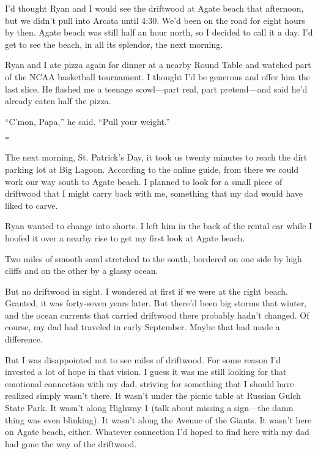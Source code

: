 \documentclass[12pt]{book}
\begin{document}
I'd thought Ryan and I would see the driftwood at Agate beach that afternoon, but we didn't pull into Arcata until 4:30. We'd been on the road for eight hours by then. Agate beach was still half an hour north, so I decided to call it a day. I'd get to see the beach, in all its splendor, the next morning.

Ryan and I ate pizza again for dinner at a nearby Round Table and watched part of the NCAA basketball tournament. I thought I'd be generous and offer him the last slice. He flashed me a teenage scowl---part real, part pretend---and said he'd already eaten half the pizza.

``C'mon, Papa,'' he said. ``Pull your weight.''

\begin{center}$*$\end{center}

The next morning, St. Patrick's Day, it took us twenty minutes to reach the dirt parking lot at Big Lagoon. According to the online guide, from there we could work our way south to Agate beach. I planned to look for a small piece of driftwood that I might carry back with me, something that my dad would have liked to carve.

Ryan wanted to change into shorts. I left him in the back of the rental car while I hoofed it over a nearby rise to get my first look at Agate beach.

Two miles of smooth sand stretched to the south, bordered on one side by high cliffs and on the other by a glassy ocean.

But no driftwood in sight. I wondered at first if we were at the right beach. Granted, it was forty-seven years later. But there'd been big storms that winter, and the ocean currents that carried driftwood there probably hadn't changed. Of course, my dad had traveled in early September. Maybe that had made a difference.

But I was disappointed not to see miles of driftwood. For some reason I'd invested a lot of hope in that vision. I guess it was me still looking for that emotional connection with my dad, striving for something that I should have realized simply wasn't there. It wasn't under the picnic table at Russian Gulch State Park. It wasn't along Highway 1 (talk about missing a sign---the damn thing was even blinking). It wasn't along the Avenue of the Giants. It wasn't here on Agate beach, either. Whatever connection I'd hoped to find here with my dad had gone the way of the driftwood.
\end{document}
